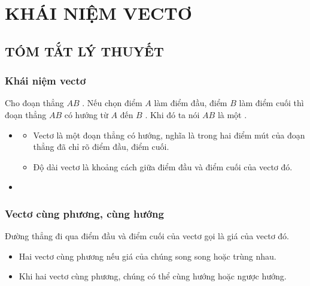 \section{KHÁI NIỆM VECTƠ}
\subsection{TÓM TẮT LÝ THUYẾT}
\subsubsection{Khái niệm vectơ}
Cho đoạn thẳng $AB$ . Nếu chọn điểm $A$  làm điểm đầu, điểm  $B$ làm điểm cuối thì đoạn thẳng $AB$  có hướng từ $A$  đến $B$ . Khi đó ta nói  $AB$ là một .	
		\begin{itemize}
		\item[\iconMT] 
		\begin{itemize}
			\item  Vectơ là một đoạn thẳng có hướng, nghĩa là trong hai điểm mút của đoạn thẳng đã chỉ rõ điểm đầu, điểm cuối.
			\item  Độ dài vectơ là khoảng cách giữa điểm đầu và điểm cuối của vectơ đó.
		\end{itemize}
		\item[\iconMT]
	\end{itemize}

\subsubsection{Vectơ cùng phương, cùng hướng}
Đường thẳng đi qua điểm đầu và điểm cuối của vectơ gọi là giá của vectơ đó.
	\begin{itemize}
		\item[\iconMT] Hai vectơ cùng phương nếu giá của chúng song song hoặc trùng nhau.	
		\item[\iconMT] Khi hai vectơ cùng phương, chúng có thể cùng hướng hoặc ngược hướng.
	\end{itemize}
